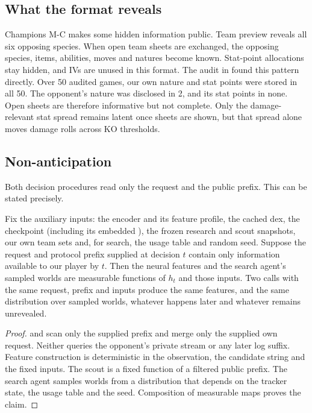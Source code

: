 \subsection{What the format reveals}
Champions M-C makes some hidden information public. Team preview reveals all
six opposing species. When open team sheets are exchanged, the opposing
species, items, abilities, moves and natures become known. Stat-point
allocations stay hidden, and IVs are unused in this format. The audit in
 found this pattern directly. Over 50
audited games, our own nature and stat points were stored in all 50. The
opponent's nature was disclosed in 2, and its stat points in none. Open sheets
are therefore informative but not complete. Only the damage-relevant stat
spread remains latent once sheets are shown, but that spread alone moves
damage rolls across KO thresholds.


\subsection{Non-anticipation}
Both decision procedures read only the request and the public prefix. This
can be stated precisely.

\begin{proposition}
\label{prop:information}
Fix the auxiliary inputs: the encoder and its feature profile, the cached dex,
the checkpoint (including its embedded ), the frozen
research and scout snapshots, our own team sets and, for search, the usage
table and random seed. Suppose the request and protocol prefix supplied at
decision $t$ contain only information available to our player by $t$. Then
the neural features and the search agent's sampled worlds are measurable
functions of $h_t$ and those inputs. Two calls with the same request, prefix
and inputs produce the same features, and the same distribution over sampled
worlds, whatever happens later and whatever remains unrevealed.
\end{proposition}
\begin{proof}
 and  scan only the supplied prefix and merge
only the supplied own request. Neither queries the opponent's private stream
or any later log suffix. Feature construction is deterministic in the
observation, the candidate string and the fixed inputs. The scout is a fixed
function of a filtered public prefix. The search agent samples worlds from a
distribution that depends on the tracker state, the usage table and the seed.
Composition of measurable maps proves the claim.
\end{proof}

